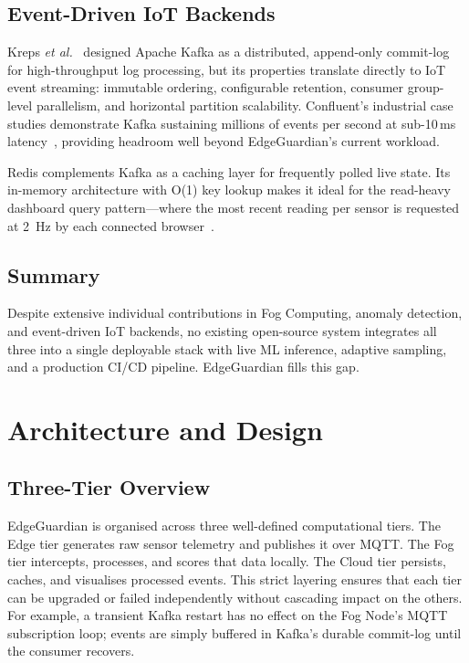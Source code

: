 \documentclass[conference]{IEEEtran}
\begin{document}
\subsection{Event-Driven IoT Backends}

Kreps \textit{et al.}~\cite{b9} designed Apache Kafka as a distributed,
append-only commit-log for high-throughput log processing, but its properties
translate directly to IoT event streaming: immutable ordering, configurable
retention, consumer group-level parallelism, and horizontal partition
scalability. Confluent's industrial case studies demonstrate Kafka sustaining
millions of events per second at sub-10\,ms latency~\cite{b10}, providing
headroom well beyond EdgeGuardian's current workload.

Redis complements Kafka as a caching layer for frequently polled live state.
Its in-memory architecture with O(1) key lookup makes it ideal for the
read-heavy dashboard query pattern---where the most recent reading per sensor
is requested at 2~Hz by each connected browser~\cite{b11}.

\subsection{Summary}

Despite extensive individual contributions in Fog Computing, anomaly detection,
and event-driven IoT backends, no existing open-source system integrates all
three into a single deployable stack with live ML inference, adaptive sampling,
and a production CI/CD pipeline. EdgeGuardian fills this gap.

\section{Architecture and Design}
\label{sec:arch}

\subsection{Three-Tier Overview}

EdgeGuardian is organised across three well-defined computational tiers.
The Edge tier generates raw sensor telemetry and publishes it over MQTT.
The Fog tier intercepts, processes, and scores that data locally.
The Cloud tier persists, caches, and visualises processed events.
This strict layering ensures that each tier can be upgraded or failed
independently without cascading impact on the others. For example, a
transient Kafka restart has no effect on the Fog Node's MQTT subscription
loop; events are simply buffered in Kafka's durable commit-log until the
consumer recovers.
\end{document}
